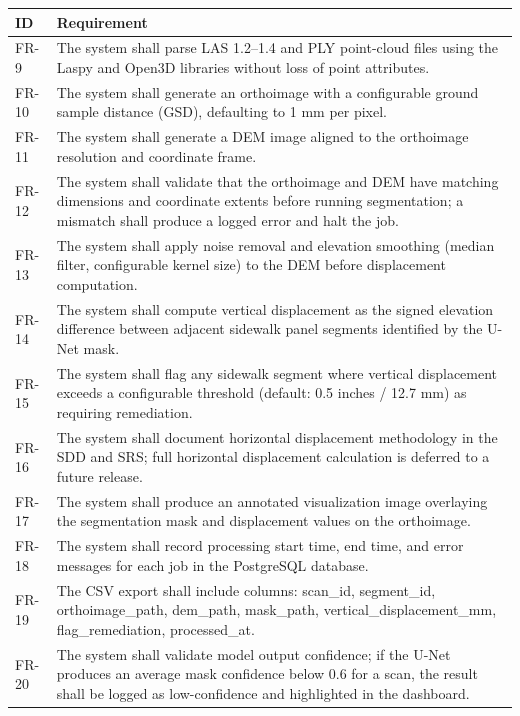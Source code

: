 \documentclass{article}
\begin{document}
\begin{longtable}{|p{0.8in}|p{5.4in}|}
\hline
\textbf{ID} & \textbf{Requirement} \\
\hline
FR-9 & The system shall parse LAS 1.2--1.4 and PLY point-cloud files using the Laspy
  and Open3D libraries without loss of point attributes. \\
\hline
FR-10 & The system shall generate an orthoimage with a configurable ground sample distance
  (GSD), defaulting to 1 mm per pixel. \\
\hline
FR-11 & The system shall generate a DEM image aligned to the orthoimage resolution and
  coordinate frame. \\
\hline
FR-12 & The system shall validate that the orthoimage and DEM have matching dimensions and
  coordinate extents before running segmentation; a mismatch shall produce a logged error
  and halt the job. \\
\hline
FR-13 & The system shall apply noise removal and elevation smoothing (median filter,
  configurable kernel size) to the DEM before displacement computation. \\
\hline
FR-14 & The system shall compute vertical displacement as the signed elevation difference
  between adjacent sidewalk panel segments identified by the U-Net mask. \\
\hline
FR-15 & The system shall flag any sidewalk segment where vertical displacement exceeds
  a configurable threshold (default: 0.5 inches / 12.7 mm) as requiring remediation. \\
\hline
FR-16 & The system shall document horizontal displacement methodology in the SDD and
  SRS; full horizontal displacement calculation is deferred to a future release. \\
\hline
FR-17 & The system shall produce an annotated visualization image overlaying the
  segmentation mask and displacement values on the orthoimage. \\
\hline
FR-18 & The system shall record processing start time, end time, and error messages for
  each job in the PostgreSQL database. \\
\hline
FR-19 & The CSV export shall include columns: scan\_id, segment\_id, orthoimage\_path,
  dem\_path, mask\_path, vertical\_displacement\_mm, flag\_remediation,
  processed\_at. \\
\hline
FR-20 & The system shall validate model output confidence; if the U-Net produces an
  average mask confidence below 0.6 for a scan, the result shall be logged as
  low-confidence and highlighted in the dashboard. \\
\hline
\end{longtable}
\end{document}
